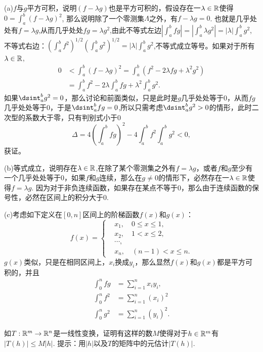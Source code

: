 \begin{problemset}
(a)$f$与$g$平方可积，说明$(f-\lambda{}g)$也是平方可积的，假设存在一$\lambda \in \mathbb{R}$使得$0 = \int_{a}^{b}{(f - \lambda{}g)^2}$, 那么说明除了一个零测集$\Lambda$之外，有$f - \lambda{}g = 0$. 也就是几乎处处有$f = \lambda{}g$,从而几乎处处$fg = \lambda{}g^2$,由此不等式左边$\left|\int_{a}^{b}{fg}\right| = \left|\int_{a}^{b}{\lambda{}g^2}\right| = |\lambda|\int_{a}^{b}{g^2}$, 不等式右边：$\left(\int_{a}^{b}{f^2}\right)^{1/2}\left(\int_{a}^{b}{g^2}\right)^{1/2} = |\lambda|\int_{a}^{b}{g^2}$,不等式成立等号。如果对于所有$\lambda \in \mathbb{R}$, 
\[
\begin{aligned}
0 &< \int_{a}^{b}{(f - \lambda{}g)^2} = \int_{a}^{b}{(f^2 -2\lambda{}fg + \lambda^2g^2)}\\
&=\int_{a}^{b}{f^2} - 2\lambda\int_{a}^{b}{fg} + \lambda^2\int_{a}^{b}{g^2}.
\end{aligned}
\]
如果$\dsint_{a}^{b}{g^2} = 0$，那么讨论和前面类似，只是此时是$g$几乎处处等于0，从而$fg$几乎处处等于0，于是$\dsint_{a}^{b}{fg} = 0$,所以只需考虑$\dsint_{a}^{b}{g^2} > 0$的情形，此时二次型的系数大于零，只有判别式小于0
\[
\Delta = 4\left(\int_{a}^{b}{fg}\right)^2 - 4\int_{a}^{b}{f^2}\int_{a}^{b}{g^2} < 0,
\]
获证。

(b)等式成立，说明存在$\lambda \in \mathbb{R}$,在除了某个零测集之外有$f = \lambda{}g$，或者$f$和$g$至少有一个几乎处处等于0，如果$f$和$g$连续，那么在$g\neq 0$的情形下，必然存在一$\lambda \in \mathbb{R}$使得$f = \lambda{}g$. 因为对于非负连续函数，如果存在某点不等于0，那么由于连续函数的保号性，必然在区间上的积分大于0.

(c)考虑如下定义在$[0, n]$区间上的阶梯函数$f(x)$和$g(x)$：
\[
f(x) = \left\{
\begin{aligned}
&x_1, \quad 0 \le x \le 1,\\
&x_2, \quad 1 < x \le 2,\\
&\cdots, \\
&x_n, \quad (n-1) < x \le n.
\end{aligned}
\right.
\]
$g(x)$类似，只是在相同区间上，$x_i$换成$y_i$，那么显然$f(x)$和$g(x)$都是平方可积的，并且
\[
\begin{aligned}
\int_{0}^{n}{fg} &= \sum_{i=1}^{n}{x_iy_i},\\
\int_{0}^{n}{f^2} &= \sum_{i=1}^{n}{(x_i)^2}\\
\int_{0}^{n}{g^2} &= \sum_{i=1}^{n}{(y_i)^2}.
\end{aligned}
\]


\item\label{exer009010110} 如$T:\mathbb{R}^m \to \mathbb{R}^n$是一线性变换，证明有这样的数$M$使得对于$h \in \mathbb{R}^m$有$|T(h)| \le M|h|$. 提示：用$|h|$以及$T$的矩阵中的元估计$|T(h)|$.

\end{problemset}



